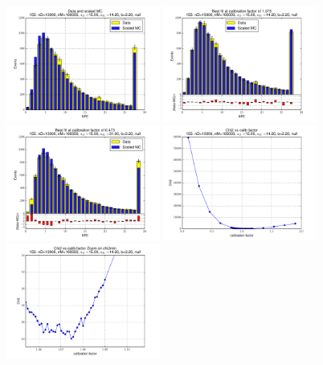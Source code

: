 
 \begin{figure}[htbp] \begin{center} 
\includegraphics[width=0.45\textwidth]{../FIGURES/155/FIG_Data_and_scaled_MC.pdf} 
\includegraphics[width=0.45\textwidth]{../FIGURES/155/FIG_Best_fit_at_calibration_factor_of_1_075.pdf} 
\includegraphics[width=0.45\textwidth]{../FIGURES/155/FIG_Best_fit_at_calibration_factor_of_0_473.pdf} 
\includegraphics[width=0.45\textwidth]{../FIGURES/155/FIG_Chi2_vs_calib_factor.pdf} 
\includegraphics[width=0.45\textwidth]{../FIGURES/155/FIG_Chi2_vs_calib_factor_Zoom_on_chi2min.pdf} 

\end{center}
\end{figure}
